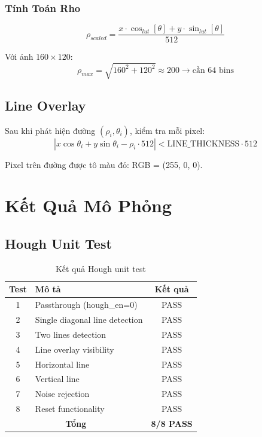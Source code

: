\documentclass[12pt,a4paper]{report}
\begin{document}
\subsection{Tính Toán Rho}
\begin{equation}
    \rho_{scaled} = \frac{x \cdot \cos_{lut}[\theta] + y \cdot \sin_{lut}[\theta]}{512}
\end{equation}

Với ảnh $160 \times 120$:
\begin{equation}
    \rho_{max} = \sqrt{160^2 + 120^2} \approx 200 \rightarrow \text{cần 64 bins}
\end{equation}

\section{Line Overlay}
Sau khi phát hiện đường $(\rho_i, \theta_i)$, kiểm tra mỗi pixel:
\begin{equation}
    |x \cos\theta_i + y \sin\theta_i - \rho_i \cdot 512| < \text{LINE\_THICKNESS} \cdot 512
\end{equation}

Pixel trên đường được tô màu đỏ: RGB = (255, 0, 0).

\chapter{Kết Quả Mô Phỏng}

\section{Hough Unit Test}

\begin{table}[h]
\centering
\begin{tabular}{|c|l|c|}
\hline
\textbf{Test} & \textbf{Mô tả} & \textbf{Kết quả} \\
\hline
1 & Passthrough (hough\_en=0) & PASS \\
2 & Single diagonal line detection & PASS \\
3 & Two lines detection & PASS \\
4 & Line overlay visibility & PASS \\
5 & Horizontal line & PASS \\
6 & Vertical line & PASS \\
7 & Noise rejection & PASS \\
8 & Reset functionality & PASS \\
\hline
\multicolumn{2}{|c|}{\textbf{Tổng}} & \textbf{8/8 PASS} \\
\hline
\end{tabular}
\caption{Kết quả Hough unit test}
\end{table}
\end{document}

